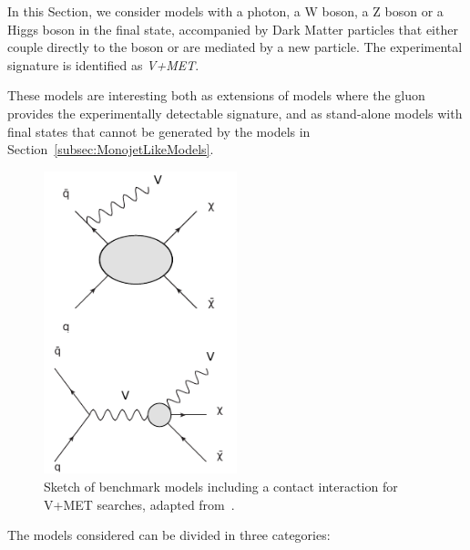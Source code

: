 
In this Section, we consider models with a photon, a W boson, a Z boson or a Higgs boson in the final state, 
accompanied by Dark Matter particles that either couple directly to the boson or are mediated by 
a new particle. The experimental signature is identified as \textit{V+MET}. 

These models are interesting both as extensions of models where the gluon provides 
the experimentally detectable signature, 
and as stand-alone models with final states that cannot be generated by the models in
Section~\ref{subsec:MonojetLikeModels}.


\begin{figure}[h!]
  \centering
    \includegraphics[width=0.5\textwidth]{figures/EW/VPlusMET_EFT}
  \caption{Sketch of benchmark models including a contact interaction 
  for V+MET searches, adapted from~\cite{Nelson:2013pqa}. \label{fig:VPlusMET_EFT}}
\end{figure}
% 
The models considered can be divided in three categories:
